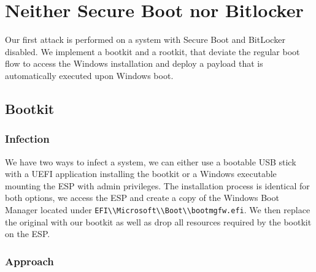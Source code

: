 
\section{Neither Secure Boot nor Bitlocker}

Our first attack is performed on a system with Secure Boot and BitLocker disabled.
We implement a bootkit and a rootkit, that deviate the regular boot flow to access the Windows installation and deploy a payload that is automatically executed upon Windows boot.

\subsection{Bootkit}

\subsubsection{Infection}


We have two ways to infect a system, we can either use a bootable USB stick with a UEFI application installing the bootkit or a Windows executable mounting the \ac{ESP} with admin privileges.
The installation process is identical for both options, we access the \ac{ESP} and create a copy of the Windows Boot Manager located under \lstinline{EFI\\Microsoft\\Boot\\bootmgfw.efi}. We then replace the original with our bootkit as well as drop all resources required by the bootkit on the \ac{ESP}.

\subsubsection{Approach}

